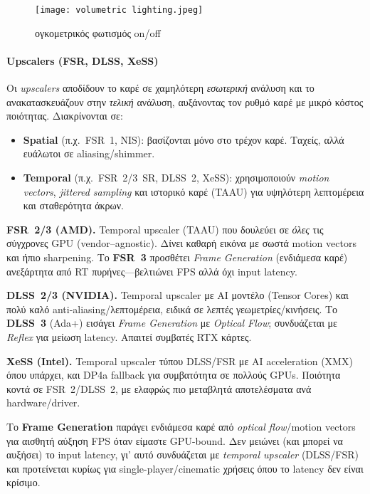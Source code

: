 \begin{figure}[H]
    \centering
    \texttt{[image: volumetric lighting.jpeg]}
    \caption{ογκομετρικός φωτισμός on/off}
    \label{fig:placeholder}
\end{figure}

\paragraph{Upscalers (FSR, DLSS, XeSS)}
Οι \emph{upscalers} αποδίδουν το καρέ σε χαμηλότερη \emph{εσωτερική} ανάλυση και το ανακατασκευάζουν στην \emph{τελική} ανάλυση, αυξάνοντας τον ρυθμό καρέ με μικρό κόστος ποιότητας. Διακρίνονται σε:
\begin{itemize}
  \item \textbf{Spatial} (π.χ.\ FSR~1, NIS): βασίζονται μόνο στο τρέχον καρέ. Ταχείς, αλλά ευάλωτοι σε aliasing/shimmer.
  \item \textbf{Temporal} (π.χ.\ FSR~2/3~SR, DLSS~2, XeSS): χρησιμοποιούν \emph{motion vectors}, \emph{jittered sampling} και ιστορικό καρέ (TAAU) για υψηλότερη λεπτομέρεια και σταθερότητα άκρων.
\end{itemize}

\textbf{FSR~2/3 (AMD).} Temporal upscaler (TAAU) που δουλεύει σε \emph{όλες} τις σύγχρονες GPU (vendor–agnostic). Δίνει καθαρή εικόνα με σωστά motion vectors και ήπιο sharpening. Το \textbf{FSR~3} προσθέτει \emph{Frame Generation} (ενδιάμεσα καρέ) ανεξάρτητα από RT πυρήνες—βελτιώνει FPS αλλά όχι input latency.

\textbf{DLSS~2/3 (NVIDIA).} Temporal upscaler με AI μοντέλο (Tensor Cores) και πολύ καλό anti-aliasing/λεπτομέρεια, ειδικά σε λεπτές γεωμετρίες/κινήσεις. Το \textbf{DLSS~3} (Ada+) εισάγει \emph{Frame Generation} με \emph{Optical Flow}; συνδυάζεται με \emph{Reflex} για μείωση latency. Απαιτεί συμβατές RTX κάρτες.

\textbf{XeSS (Intel).} Temporal upscaler τύπου DLSS/FSR με AI acceleration (XMX) όπου υπάρχει, και DP4a fallback για συμβατότητα σε πολλούς GPUs. Ποιότητα κοντά σε FSR~2/DLSS~2, με ελαφρώς πιο μεταβλητά αποτελέσματα ανά hardware/driver.

Το \textbf{Frame Generation} παράγει ενδιάμεσα καρέ από \emph{optical flow}/motion vectors για αισθητή αύξηση FPS όταν είμαστε GPU-bound. Δεν μειώνει (και μπορεί να αυξήσει) το input latency, γι’ αυτό συνδυάζεται με \emph{temporal upscaler} (DLSS/FSR) και προτείνεται κυρίως για single-player/cinematic χρήσεις όπου το latency δεν είναι κρίσιμο.

